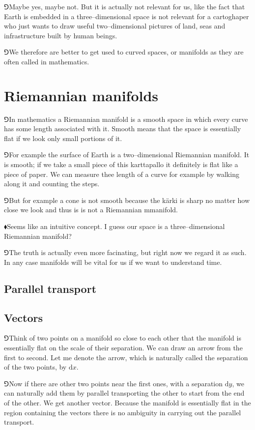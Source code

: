 \documentclass[10pt,oneside%
]{memoir}
\newcommand{\dd}{\mathrm{d}}
\newcommand{\hea}{\(\blacklozenge\)\;}
\newcommand{\heb}{\(\Game\)\;}
\begin{document}
\heb Maybe yes, maybe not. But it is actually not relevant for us, like the fact that Earth is embedded in a three--dimensional space is not relevant for a cartoghaper who just wants to draw useful two--dimensional pictures of land, seas and infrastructure built by human beings.

\heb We therefore are better to get used to curved spaces, or manifolds as they are often called in mathematics.
\section{Riemannian manifolds}
\heb In mathematics a Riemannian manifold is a smooth space in which every curve has some length associated with it. Smooth means that the space is essentially flat if we look only small portions of it.

\heb For example the surface of Earth is a two--dimensional Riemannian manifold. It is smooth; if we take a small piece of this karttapallo it definitely is flat like a piece of paper. We can measure thee length of a curve for example by walking along it and counting the steps.

\heb But for example a cone is not smooth because the kärki is sharp no matter how close we look and thus is is not a Riemannian mmanifold.

\hea Seems like an intuitive concept. I guess our space is a three--dimensional Riemannian manifold?

\heb The truth is actually even more facinating, but right now we regard it as such. In any case manifolds will be vital for us if we want to understand time.
\subsection{Parallel transport}
\subsection{Vectors}
\heb Think of two points on a manifold so close to each other that the manifold is essentially flat on the scale of their separation. We can draw an arrow from the first to second. Let me denote the arrow, which is naturally called the separation of the two points, by \(\dd x\).

\heb Now if there are other two points near the first ones, with a separation \(\dd y\), we can naturally add them by parallel transporting the other to start from the end of the other. We get another vector. Because the manifold is essentially flat in the region containing the vectors there is no ambiguity in carrying out the parallel transport.
\end{document}
